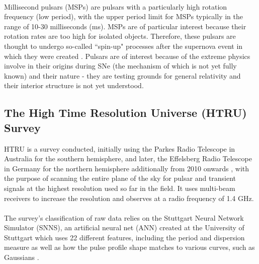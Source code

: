 \documentclass[12pt]{article}
\begin{document}
\paragraph{}
Millisecond pulsars (MSPs) are pulsars with a particularly high rotation frequency (low period), with the upper period limit for MSPs typically in the range of 10-30 milliseconds (ms). MSPs are of particular interest because their rotation rates are too high for isolated objects. Therefore, these pulsars are thought to undergo so-called ``spin-up" processes after the supernova event in which they were created \cite{lorimer2008binary}. Pulsars are of interest because of the extreme physics involve in their origins during SNe (the mechanism of which is not yet fully known) and their nature - they are testing grounds for general relativity and their interior structure is not yet understood.

\subsection{The High Time Resolution Universe (HTRU) Survey}
HTRU is a survey conducted, initially using the Parkes Radio Telescope in Australia for the southern hemisphere, and later, the Effelsberg Radio Telescope in Germany for the northern hemisphere additionally from 2010 onwards \cite{keith2010high}\cite{ng2012conducting}, with the purpose of scanning the entire plane of the sky for pulsar and transient signals at the highest resolution used so far in the field. It uses multi-beam receivers to increase the resolution and observes at a radio frequency of 1.4 GHz.
\paragraph{}
The survey's classification of raw data relies on the Stuttgart Neural Network Simulator (SNNS), an artificial neural net (ANN) created at the University of Stuttgart which uses 22 different features, including the period and dispersion measure as well as how the pulse profile shape matches to various curves, such as Gaussians \cite{thornton2013high}.
\end{document}
